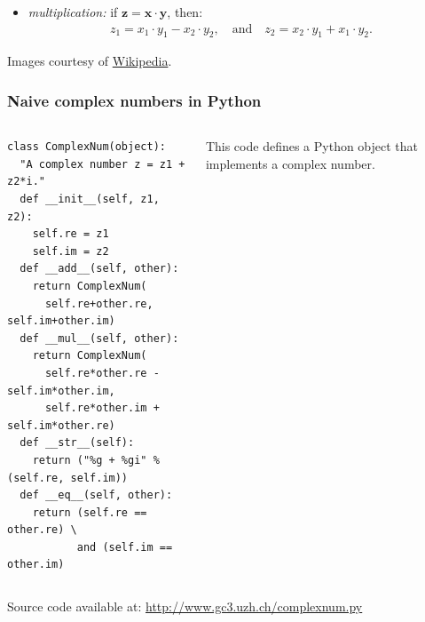 \documentclass[english,serif,mathserif,xcolor=pdftex,dvipsnames,table]{beamer}
\begin{document}
\begin{frame}
\begin{itemize}
  \item
    \emph{multiplication:} if $\mathbf{z} = \mathbf{x} \cdot
    \mathbf{y}$, then:
    \begin{gather*}
      z_1 = x_1\cdot y_1 - x_2 \cdot y_2,
      \quad\text{and}\quad
      z_2 = x_2\cdot y_1 + x_1\cdot y_2.
    \end{gather*}

  \end{itemize}

  \begin{references}
    Images courtesy of \href{http://en.wikipedia.org/wiki/Complex_number}{Wikipedia}.
  \end{references}
\end{frame}


\begin{frame}[fragile]
  \frametitle{Naive complex numbers in Python}
  \begin{columns}[t]
    \begin{column}{0.5\textwidth}
\begin{lstlisting}[showstringspaces=false]
class ComplexNum(object):
  "A complex number z = z1 + z2*i."
  def __init__(self, z1, z2):
    self.re = z1
    self.im = z2
  def __add__(self, other):
    return ComplexNum(
      self.re+other.re, self.im+other.im)
  def __mul__(self, other):
    return ComplexNum(
      self.re*other.re - self.im*other.im,
      self.re*other.im + self.im*other.re)
  def __str__(self):
    return ("%g + %gi" % (self.re, self.im))
  def __eq__(self, other):
    return (self.re == other.re) \
           and (self.im == other.im)
\end{lstlisting}
    \end{column}
    \begin{column}{0.5\textwidth}
      \raggedleft
      This code defines a Python object that implements a complex number.
    \end{column}
  \end{columns}

  \+
  {\scriptsize Source code available at:
    \url{http://www.gc3.uzh.ch/complexnum.py}}
\end{frame}
\end{document}
